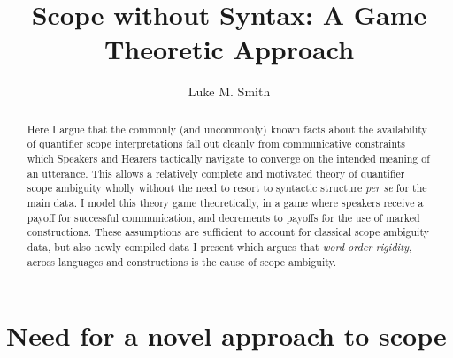 \documentclass{article}
\title{Scope without Syntax: A Game Theoretic Approach}
\author{Luke M. Smith}
\begin{document}
\maketitle

\begin{abstract}
	Here I argue that the commonly (and uncommonly) known facts about the availability of quantifier scope interpretations fall out cleanly from communicative constraints which Speakers and Hearers tactically navigate to converge on the intended meaning of an utterance.
	This allows a relatively complete and motivated theory of quantifier scope ambiguity wholly without the need to resort to syntactic structure \textit{per se} for the main data.
	I model this theory game theoretically, in a game where speakers receive a payoff for successful communication, and decrements to payoffs for the use of marked constructions.
	These assumptions are sufficient to account for classical scope ambiguity data, but also newly compiled data I present which argues that \emph{word order rigidity}, across languages and constructions is the cause of scope ambiguity.
\end{abstract}




\tableofcontents

\listoffigures

\section{Need for a novel approach to scope}
\end{document}
